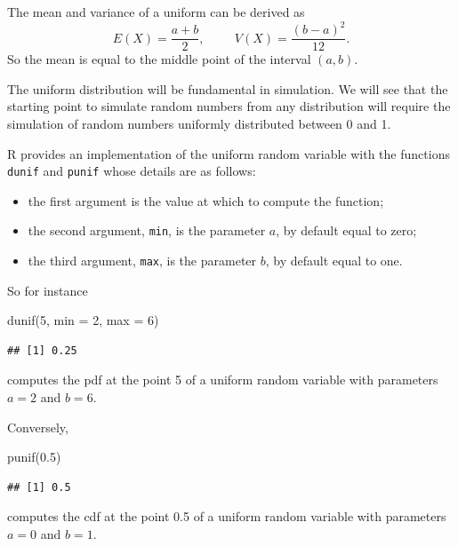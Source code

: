\documentclass[
]{book}
\newenvironment{Shaded}{\begin{snugshade}}{\end{snugshade}}
\newcommand{\AttributeTok}[1]{\textcolor[rgb]{0.77,0.63,0.00}{#1}}
\newcommand{\DecValTok}[1]{\textcolor[rgb]{0.00,0.00,0.81}{#1}}
\newcommand{\FloatTok}[1]{\textcolor[rgb]{0.00,0.00,0.81}{#1}}
\newcommand{\FunctionTok}[1]{\textcolor[rgb]{0.00,0.00,0.00}{#1}}
\newcommand{\NormalTok}[1]{#1}
\begin{document}
The mean and variance of a uniform can be derived as
\[
E(X)=\frac{a+b}{2}, \hspace{1cm} V(X)=\frac{(b-a)^2}{12}.
\]
So the mean is equal to the middle point of the interval \((a,b)\).

The uniform distribution will be fundamental in simulation. We will see that the starting point to simulate random numbers from any distribution will require the simulation of random numbers uniformly distributed between 0 and 1.

R provides an implementation of the uniform random variable with the functions \texttt{dunif} and \texttt{punif} whose details are as follows:

\begin{itemize}
\item
  the first argument is the value at which to compute the function;
\item
  the second argument, \texttt{min}, is the parameter \(a\), by default equal to zero;
\item
  the third argument, \texttt{max}, is the parameter \(b\), by default equal to one.
\end{itemize}

So for instance

\begin{Shaded}
\begin{Highlighting}[]
\FunctionTok{dunif}\NormalTok{(}\DecValTok{5}\NormalTok{, }\AttributeTok{min =} \DecValTok{2}\NormalTok{, }\AttributeTok{max =} \DecValTok{6}\NormalTok{)}
\end{Highlighting}
\end{Shaded}

\begin{verbatim}
## [1] 0.25
\end{verbatim}

computes the pdf at the point 5 of a uniform random variable with parameters \(a=2\) and \(b=6\).

Conversely,

\begin{Shaded}
\begin{Highlighting}[]
\FunctionTok{punif}\NormalTok{(}\FloatTok{0.5}\NormalTok{)}
\end{Highlighting}
\end{Shaded}

\begin{verbatim}
## [1] 0.5
\end{verbatim}

computes the cdf at the point 0.5 of a uniform random variable with parameters \(a=0\) and \(b=1\).
\end{document}

